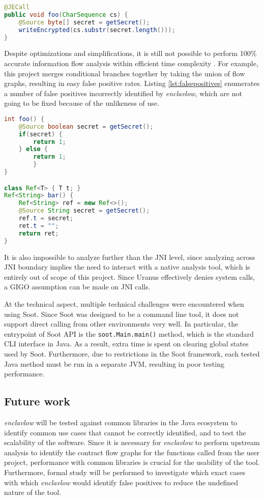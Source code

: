 \documentclass[a4paper, 12pt]{article}
\def\pname{\emph{enclavlow}}
\def\code#1{\colorbox{code}{\texttt{\footnotesize #1}}}
\begin{document}
\begin{lstlisting}[style=j, language=java, label={lst:oop},
caption={Example attack through OOP substitution}]
@JECall
public void foo(CharSequence cs) {
	@Source byte[] secret = getSecret();
	writeEncrypted(cs.substr(secret.length()));
}
\end{lstlisting}

Despite optimizations and simplifications,
it is still not possible to perform 100\% accurate information flow analysis
within efficient time complexity \cite{SmithGeoffrey2007PoSI}.
For example, this project merges conditional branches together
by taking the union of flow graphs,
resulting in easy false positive rates.
Listing \ref{lst:falsepositives} enumerates a number of false positives
incorrectly identified by \pname{},
which are not going to be fixed because of the unlikeness of use.

\begin{lstlisting}[style=j, language=java, label={lst:falsepositives}]
int foo() {
	@Source boolean secret = getSecret();
	if(secret) {
		return 1;
	} else {
		return 1;
		}
}

class Ref<T> { T t; }
Ref<String> bar() {
	Ref<String> ref = new Ref<>();
	@Source String secret = getSecret();
	ref.t = secret;
	ret.t = "";
	return ret;
}
\end{lstlisting}

It is also impossible to analyze further than the JNI level,
since analyzing across JNI boundary implies
the need to interact with a native analysis tool,
which is entirely out of scope of this project.
Since Uranus effectively denies system calls,
a GIGO assumption can be made on JNI calls.

At the technical aspect,
multiple technical challenges were encountered when using Soot.
Since Soot was designed to be a command line tool,
it does not support direct calling from other environments very well.
In particular, the entrypoint of Soot API is the \code{soot.Main.main()} method,
which is the standard CLI interface in Java.
As a result, extra time is spent on clearing global states used by Soot.
Furthermore, due to restrictions in the Soot framework,
each tested Java method must be run in a separate JVM,
resulting in poor testing performance.

\subsection{Future work}
\pname{} will be tested against common libraries in the Java ecosystem
to identify common use cases that cannot be correctly identified,
and to test the scalability of the software.
Since it is necessary for \pname{} to perform upstream analysis
to identify the contract flow graphs for the functions called from the user project,
performance with common libraries is crucial for the usability of the tool.
Furthermore, formal study will be performed to investigate
which exact cases with which \pname{} would identify false positives
to reduce the undefined nature of the tool.
\end{document}
